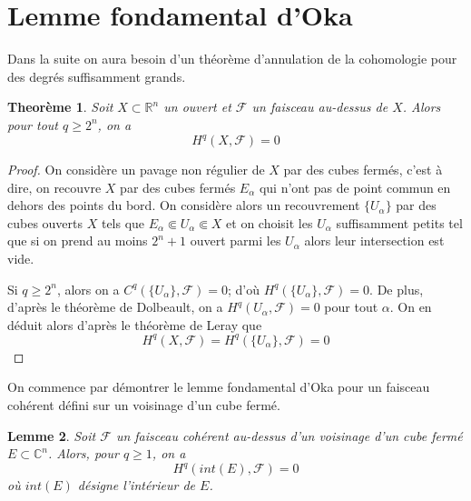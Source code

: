 \documentclass{article}
\newtheorem{theoreme}{Theorème}[section]
\newtheorem{lemme}[theoreme]{Lemme}
\theoremstyle{definition}
\theoremstyle{remarque}
\begin{document}
\section{Lemme fondamental d'Oka}

Dans la suite on aura besoin d'un théorème d'annulation de la cohomologie pour des degrés suffisamment grands.
\begin{theoreme}
Soit $X \subset \mathbb{R}^n$ un ouvert et $\mathcal{F}$ un faisceau au-dessus de $X$. Alors pour tout $q \geq 2^n$, on a $$H^q(X, \mathcal{F})=0$$
\end{theoreme}

\begin{proof}
On considère un pavage non régulier de $X$ par des cubes fermés, c'est à dire, on recouvre $X$ par des cubes fermés $E_\alpha$ qui n'ont pas de point commun en dehors des points du bord. On considère alors un recouvrement $\{U_\alpha\}$ par des cubes ouverts $X$ tels que $E_\alpha \Subset U_\alpha \Subset X$ et on choisit les $U_\alpha$ suffisamment petits tel que si on prend au moins $2^n+1$ ouvert parmi les $U_\alpha$ alors leur intersection est vide.

Si $q \geq 2^n$, alors on a $C^q(\{U_\alpha\}, \mathcal{F})=0$; d'où $H^q(\{U_\alpha\}, \mathcal{F})=0$. De plus, d'après le théorème de Dolbeault, on a $H^q(U_\alpha, \mathcal{F})=0$ pour tout $\alpha$. On en déduit alors d'après le théorème de Leray que
$$H^q(X, \mathcal{F})=H^q(\{U_\alpha\}, \mathcal{F})=0$$
\end{proof}

On commence par démontrer le lemme fondamental d'Oka pour un faisceau cohérent défini sur un voisinage d'un cube fermé.
\begin{lemme}
Soit $\mathcal{F}$ un faisceau cohérent au-dessus d'un voisinage d'un cube fermé $E \subset \mathbb{C}^n$. Alors, pour $q \geq 1$, on a
$$H^q(int(E), \mathcal{F})=0$$
où $int(E)$ désigne l'intérieur de $E$.
\end{lemme}
\end{document}
